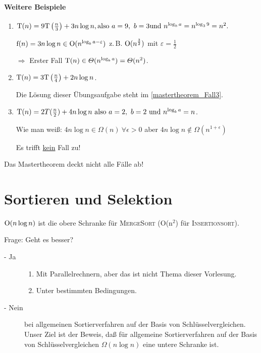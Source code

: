 \documentclass[ngerman,draft,parskip=half*,twoside]{scrreprt}
\theoremstyle{break}
\begin{document}
\subsubsection{Weitere Beispiele}
\begin{enumerate}
\item \( \textup{T}(n) = 9 \textup{T}\left(\frac{n}{3}\right) + 3 n\log n, \textup{also}\ a = 9,\ b = 3
\textup{und}\ n^{\log_ba} = n^{\log_39} = n^2.\)

\(\textup{f}(n) = 3n\log n \in \textup{O}(n^{\log_ba-\varepsilon}) \)
z.\,B. \(\textup{O}(n^{\frac{3}{2}})\) mit \( \varepsilon = \frac{1}{2} \)

\( \Rightarrow \) Erster Fall \( \textup{T}(n) \in \Theta(n^{\log_ba}) = \Theta (n^2) \).

\item \( \textup{T}(n) = 3 \textup{T}\left(\frac{n}{4}\right) + 2n\log n\).

Die Lösung dieser Übungsaufgabe steht im \autoref{mastertheorem_Fall3}.

\item \( \textup{T}(n) = 2 T(\frac{n}{2}) + 4n\log n\ \textup{also}\
a = 2,\ b = 2\ \textup{und}\ n^{\log_ba} = n \).

Wie man weiß: \(4n\log n \in \Omega(n)\ \forall \epsilon >0\) aber \(4n\log n \notin \Omega(n^{1+\epsilon})\)
	
Es trifft {\underline {kein}} Fall zu!
\end{enumerate}
Das Mastertheorem deckt nicht alle Fälle ab!
	
%
\chapter{Sortieren und Selektion}

\( \textup{O}(n\log n) \) ist die obere Schranke für \textsc{MergeSort} (O(n$^2$) für \textsc{Insertionsort}).

Frage: Geht es besser? 
\begin{description}
	\item[- Ja]
		\begin{enumerate}
			\item Mit Parallelrechnern, aber das ist nicht Thema dieser Vorlesung.
			\item Unter bestimmten Bedingungen.
		\end{enumerate}
	\item[- Nein]
		bei allgemeinen Sortierverfahren auf der Basis von Schlüsselvergleichen. Unser Ziel ist der Beweis, daß für  
		allgemeine Sortierverfahren auf der Basis von Schlüsselvergleichen \( \Omega(n\log n)\) eine untere Schranke ist.
\end{description} 
\end{document}
